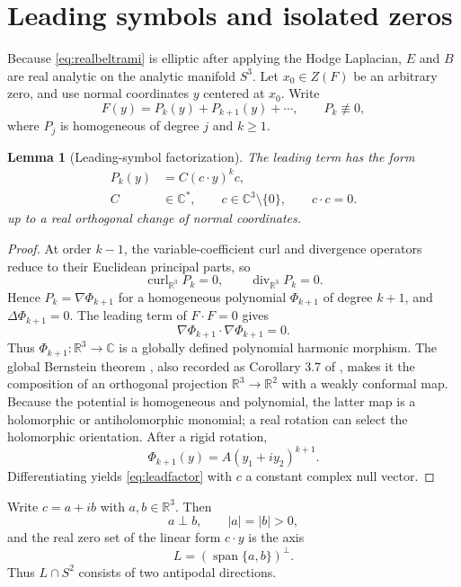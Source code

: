\documentclass[aps,prd,reprint,nofootinbib,superscriptaddress]{revtex4-2}
\newtheorem{lemma}[theorem]{Lemma}
\theoremstyle{definition}
\theoremstyle{remark}
\newcommand{\R}{\mathbb{R}}
\newcommand{\C}{\mathbb{C}}
\newcommand{\Div}{\operatorname{div}}
\newcommand{\Curl}{\operatorname{curl}}
\newcommand{\Span}{\operatorname{span}}
\begin{document}
\section{Leading symbols and isolated zeros}

Because \eqref{eq:realbeltrami} is elliptic after applying the Hodge Laplacian, $E$ and $B$ are real analytic on the analytic manifold $S^3$. Let $x_0\in Z(F)$ be an arbitrary zero, and use normal coordinates $y$ centered at $x_0$. Write
\begin{equation}
F(y)=P_k(y)+P_{k+1}(y)+\cdots,
\qquad P_k\not\equiv0,
\label{eq:Taylor}
\end{equation}
where $P_j$ is homogeneous of degree $j$ and $k\ge1$.

\begin{lemma}[Leading-symbol factorization]
\label{lem:leading}
The leading term has the form
\begin{align}
P_k(y)&=C(c\cdot y)^k c,\nonumber\\
C&\in\C^*,\qquad c\in\C^3\setminus\{0\},\qquad c\cdot c=0.
\label{eq:leadfactor}
\end{align}
up to a real orthogonal change of normal coordinates.
\end{lemma}

\begin{proof}
At order $k-1$, the variable-coefficient curl and divergence operators reduce to their Euclidean principal parts, so
\[
\Curl_{\R^3}P_k=0,
\qquad
\Div_{\R^3}P_k=0.
\]
Hence $P_k=\nabla\Phi_{k+1}$ for a homogeneous polynomial $\Phi_{k+1}$ of degree $k+1$, and $\Delta\Phi_{k+1}=0$. The leading term of $F\cdot F=0$ gives
\[
\nabla\Phi_{k+1}\cdot\nabla\Phi_{k+1}=0.
\]
Thus $\Phi_{k+1}:\R^3\to\C$ is a globally defined polynomial harmonic morphism. The global Bernstein theorem \cite{BairdWood1988}, also recorded as Corollary 3.7 of \cite{BairdWood1991}, makes it the composition of an orthogonal projection $\R^3\to\R^2$ with a weakly conformal map. Because the potential is homogeneous and polynomial, the latter map is a holomorphic or antiholomorphic monomial; a real rotation can select the holomorphic orientation. After a rigid rotation,
\[
\Phi_{k+1}(y)=A(y_1+iy_2)^{k+1}.
\]
Differentiating yields \eqref{eq:leadfactor} with $c$ a constant complex null vector.
\end{proof}

Write $c=a+ib$ with $a,b\in\R^3$. Then
\begin{equation}
a\perp b,
\qquad |a|=|b|>0,
\label{eq:abnull}
\end{equation}
and the real zero set of the linear form $c\cdot y$ is the axis
\begin{equation}
L=(\Span\{a,b\})^\perp.
\label{eq:axis}
\end{equation}
Thus $L\cap S^2$ consists of two antipodal directions.
\end{document}
